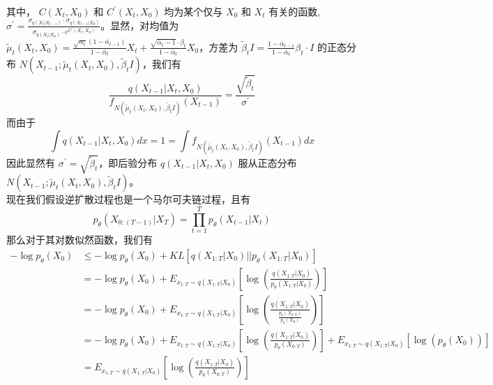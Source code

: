 \documentclass[12pt,a4paper,UTF8]{article}
\begin{document}
其中， $C\left(X_t,X_0\right)$ 和 $C^{\prime}\left(X_t,X_0\right)$ 均为某个仅与 $X_0$ 和 $X_t$ 有关的函数, $\sigma^{\prime}=\frac{\sigma_{q\left(X_t|X_{t-1}\right)}\cdot\sigma_{q\left(X_{t-1}|X_0\right)}}{\sigma_{q\left(X_t|X_0\right)}\cdot e^{C^{\prime}\left(X_t,X_0\right)}}$。显然，对均值为 $\tilde{\mu}_t\left(X_t,X_0\right)=\frac{\sqrt{\alpha_t}\left(1-\bar{\alpha}_{t-1}\right)}{1-\bar{\alpha}_t}X_t+\frac{\sqrt{\bar{\alpha}_t-1}\cdot\beta_t}{1-\bar{\alpha}_t}X_0$，方差为 $\tilde{\beta}_tI=\frac{1-\bar{\alpha}_{t-1}}{1-\bar{\alpha}_t}\beta_t\cdot I$ 的正态分布 $N\left(X_{t-1};\tilde{\mu}_t\left(X_t,X_0\right),\tilde{\beta}_tI\right)$，我们有
\[\frac{q\left(X_{t-1}|X_t,X_0\right)}{f_{N\left(\tilde{\mu}_t\left(X_t,X_0\right),\tilde{\beta}_tI\right)}\left(X_{t-1}\right)}=\frac{\sqrt{\tilde{\beta}_t}}{\sigma^{\prime}}\]
而由于
\[\int q\left(X_{t-1}|X_t,X_0\right)dx=1=\int f_{N\left(\tilde{\mu}_t\left(X_t,X_0\right),\tilde{\beta}_tI\right)}\left(X_{t-1}\right)dx\]
因此显然有 $\sigma^{\prime}=\sqrt{\tilde{\beta}_t}$，即后验分布 $q\left(X_{t-1}|X_t,X_0\right)$ 服从正态分布 $N\left(X_{t-1};\tilde{\mu}_t\left(X_t,X_0\right),\tilde{\beta}_tI\right)$。\\
\indent 现在我们假设逆扩散过程也是一个马尔可夫链过程，且有
\[p_{\theta}\left(X_{0:\left(T-1\right)}|X_T\right)=\prod\limits_{t=1}^{T}p_{\theta}\left(X_{t-1}|X_t\right)\]
那么对于其对数似然函数，我们有
\[\begin{aligned}
-\log p_{\theta}\left(X_0\right)&\leq -\log p_{\theta}\left(X_0\right)+KL\left[q\left(X_{1:T}|X_{0}\right)||p_{\theta}\left(X_{1:T}|X_{0}\right)\right]\\
&=-\log p_{\theta}\left(X_0\right)+E_{x_{1:T}\sim q\left(X_{1:T}|X_{0}\right)}\left[\log\left(\frac{q\left(X_{1:T}|X_{0}\right)}{p_{\theta}\left(X_{1:T}|X_{0}\right)}\right)\right]\\
&=-\log p_{\theta}\left(X_0\right)+E_{x_{1:T}\sim q\left(X_{1:T}|X_{0}\right)}\left[\log\left(\frac{q\left(X_{1:T}|X_{0}\right)}{\frac{p_{\theta}\left(X_{0:T}\right)}{p_{\theta}\left(X_{0}\right)}}\right)\right]\\
&=-\log p_{\theta}\left(X_0\right)+E_{x_{1:T}\sim q\left(X_{1:T}|X_{0}\right)}\left[\log\left(\frac{q\left(X_{1:T}|X_{0}\right)}{p_{\theta}\left(X_{0:T}\right)}\right)\right]+E_{x_{1:T}\sim q\left(X_{1:T}|X_{0}\right)}\left[\log\left(p_{\theta}\left(X_{0}\right)\right)\right]\\
&=E_{x_{1:T}\sim q\left(X_{1:T}|X_{0}\right)}\left[\log\left(\frac{q\left(X_{1:T}|X_{0}\right)}{p_{\theta}\left(X_{0:T}\right)}\right)\right]\\
\end{aligned}\]
\end{document}
